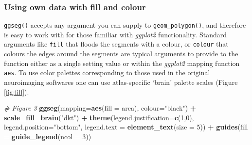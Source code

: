 \documentclass[fleqn,10pt]{wlpeerj} %
\newenvironment{Shaded}{\begin{snugshade}}{\end{snugshade}}
\newcommand{\CommentTok}[1]{\textcolor[rgb]{0.56,0.35,0.01}{\textit{#1}}}
\newcommand{\DataTypeTok}[1]{\textcolor[rgb]{0.13,0.29,0.53}{#1}}
\newcommand{\DecValTok}[1]{\textcolor[rgb]{0.00,0.00,0.81}{#1}}
\newcommand{\KeywordTok}[1]{\textcolor[rgb]{0.13,0.29,0.53}{\textbf{#1}}}
\newcommand{\NormalTok}[1]{#1}
\newcommand{\OperatorTok}[1]{\textcolor[rgb]{0.81,0.36,0.00}{\textbf{#1}}}
\newcommand{\StringTok}[1]{\textcolor[rgb]{0.31,0.60,0.02}{#1}}
\begin{document}
\hypertarget{using-own-data-with-fill-and-colour}{%
\subsubsection{Using own data with fill and colour}\label{using-own-data-with-fill-and-colour}}

\texttt{ggseg()} accepts any argument you can supply to \texttt{geom\_polygon()}, and therefore is easy to work with for those familiar with \emph{ggplot2} functionality.
Standard arguments like \texttt{fill} that floods the segments with a colour, or \texttt{colour} that colours the edges around the segments are typical arguments to provide to the function either as a single setting value or within the \emph{ggplot2} mapping function \texttt{aes}.
To use color palettes corresponding to those used in the original neuroimaging softwares one can use atlas-specific `brain' palette scales (Figure \ref{fig:fill}).

\begin{Shaded}
\begin{Highlighting}[]
\CommentTok{\# Figure 3}
\KeywordTok{ggseg}\NormalTok{(}\DataTypeTok{mapping=}\KeywordTok{aes}\NormalTok{(}\DataTypeTok{fill =}\NormalTok{ area), }\DataTypeTok{colour=}\StringTok{"black"}\NormalTok{) }\OperatorTok{+}
\StringTok{  }\KeywordTok{scale\_fill\_brain}\NormalTok{(}\StringTok{"dkt"}\NormalTok{) }\OperatorTok{+}
\StringTok{  }\KeywordTok{theme}\NormalTok{(}\DataTypeTok{legend.justification=}\KeywordTok{c}\NormalTok{(}\DecValTok{1}\NormalTok{,}\DecValTok{0}\NormalTok{),}
        \DataTypeTok{legend.position=}\StringTok{"bottom"}\NormalTok{,}
        \DataTypeTok{legend.text =} \KeywordTok{element\_text}\NormalTok{(}\DataTypeTok{size =} \DecValTok{5}\NormalTok{)) }\OperatorTok{+}
\StringTok{  }\KeywordTok{guides}\NormalTok{(}\DataTypeTok{fill =} \KeywordTok{guide\_legend}\NormalTok{(}\DataTypeTok{ncol =} \DecValTok{3}\NormalTok{))}
\end{Highlighting}
\end{Shaded}
\end{document}

